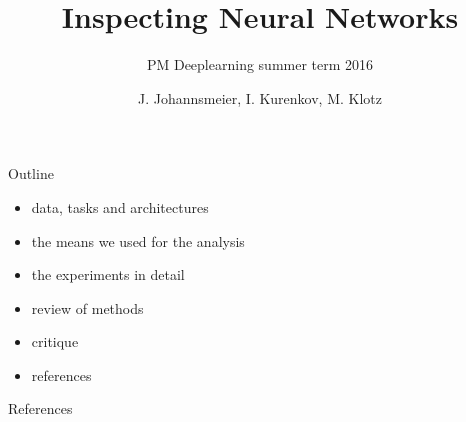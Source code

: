 \documentclass{beamer}
\title{Inspecting Neural Networks}
\subtitle{PM Deeplearning summer term 2016}
\author{J. Johannsmeier, I. Kurenkov, M. Klotz}
\begin{document}
\begin{frame}
  \titlepage
\end{frame}

\begin{frame}{Outline}
	\begin{itemize}
		\item data, tasks and architectures
		\item the means we used for the analysis
		\item the experiments in detail
		\item review of methods
		\item critique
		\item references
	\end{itemize}
\end{frame}










%
 



\begin{frame}{References}
	
\end{frame}
\end{document}
